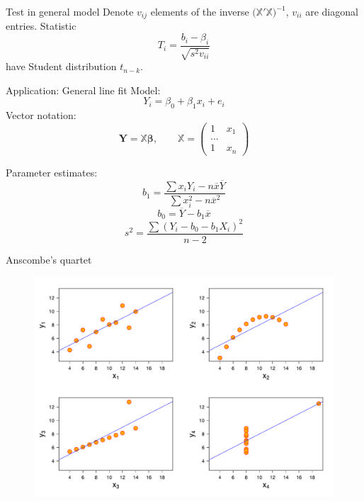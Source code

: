 \documentclass[smaller]{beamer}
\def\vc#1{\mathbf{\boldsymbol{#1}}}     %
\def\tn#1{{\mathbb{#1}}}    %
\def\ol#1{\overline{#1}}
\begin{document}
\begin{frame}{Test in general model}
Denote $v_{ij}$ elements of the inverse $\big( \tn X' \tn X \big)^{-1}$, $v_{ii}$ are diagonal entries.
Statistic
\[
  T_i = \frac{b_i - \beta_i}{\sqrt{s^2 v_{ii}}}
\]
have Student distribution $t_{n-k}$.
\end{frame}

\begin{frame}{Application: General line fit}
Model:
\[
  Y_i=\beta_0 + \beta_1 x_i + e_i
\]
Vector notation:
\[
    \vc Y = \tn X\vc \beta, \qquad
    \tn X =
    \begin{pmatrix}
        1 & x_1\\
        \dots \\
        1 & x_n    
    \end{pmatrix}    
\]
\end{frame}


\begin{frame}{Parameter estimates:}
\[
 b_1=\frac{\sum x_i Y_i - n\ol{x}\ol{Y}}
{\sum x_i^2 - n \ol{x}^2}
\]
\[
 b_0=\ol{Y}-b_1\ol{x}
\]
\[
  s^2 =\frac{\sum (Y_i-b_0 - b_1X_i)^2}{n-2}
\]
\end{frame}


\begin{frame}{Anscombe's quartet}
\begin{figure}[h]
 \centering
 \includegraphics[scale=0.3]{./12_Anscombe's_quartet.pdf}
\end{figure}
\end{frame}
\end{document}
